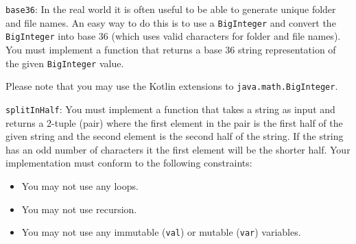 \documentclass[12pt,a4paper]{exam}
\begin{document}
\begin{questions}
\question
\verb!base36!: In the real world it is often useful to be able to generate unique folder 
and file names. An easy way to do this is to use a \verb!BigInteger! and convert the \verb!BigInteger! 
into base 36 (which uses valid characters for folder and file names). 
You must implement a function that returns a base 36 string representation of the given \verb!BigInteger! value.

Please note that you may use the Kotlin extensions to \verb!java.math.BigInteger!.

\question
\verb!splitInHalf!: 
You must implement a function that takes a string as input and returns a 2-tuple (pair) where the first element 
in the pair is the first half of the given string and the second element is the second half of the string. 
If the string has an odd number of characters it the first element will be the shorter half. 
Your implementation must conform to the following constraints:
\begin{itemize}
	\item You may not use any loops.
	\item You may not use recursion.
	\item You may not use any immutable (\verb!val!) or mutable (\verb!var!) variables.
\end{itemize}

\end{questions}
\end{document}
